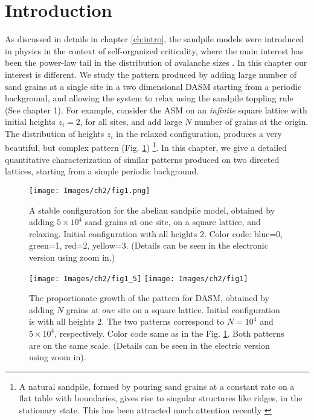 \documentclass[11pt,a4paper]{book}
\begin{document}
\section{Introduction}\label{ch2intro}
As discussed in details in chapter \ref{ch:intro}, the sandpile models were introduced in physics in the context of 
self-organized criticality, where the main interest has been the 
power-law tail in the distribution of avalanche sizes \cite{btw}.
In this chapter our interest is different. We study the 
pattern produced by adding large number of sand grains at a single 
site in a two dimensional DASM starting from a 
periodic background, and allowing the system to relax using the
sandpile toppling rule (See chapter 1). For example, consider the ASM
on an \textit{infinite} square lattice with initial heights
$z_{i}=2$, for all sites, and add large $N$ number of grains at the origin.
The distribution of heights $z_{i}$ in the relaxed configuration, produces a 
very beautiful, but complex pattern (Fig. \ref{asm})
\footnote{A natural sandpile, formed by pouring sand grains at a
constant rate on a flat table with boundaries, gives rise to singular
structures like ridges, in the stationary state. This has been
attracted much attention recently \cite{hadeler,falcone}}. In this chapter, we give a
detailed quantitative characterization of similar patterns produced on two directed lattices, starting from a
simple periodic background.
\begin{figure}
\begin{center}
  \texttt{[image: Images/ch2/fig1.png]}
  \caption{A stable configuration for the abelian sandpile model, obtained 
  by adding $5\times 10^4$ sand grains at one site, on a square
lattice, and relaxing.
  Initial configuration with all heights $2$. Color code: blue=0, green=1, 
  red=2, yellow=3. (Details can be seen in the electronic version using zoom in.)}
  \label{asm}
\end{center}
\end{figure}
\begin{figure}
\texttt{[image: Images/ch2/fig1\_5]}
\texttt{[image: Images/ch2/fig1]}
\caption{The proportionate growth of the pattern for DASM, obtained by adding
$N$ grains at \textit{one} site on a square lattice. Initial configuration
is with all heights $2$. The two patterns correspond to $N=10^{4}$ and
$5\times 10^{4}$, respectively.  Color
code same as in the Fig. \ref{asm}. Both patterns are on the same
scale. (Details can be seen in the electric version using zoom in).}
\label{fig:prop}
\end{figure}
\end{document}
